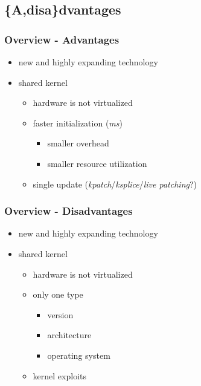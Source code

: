 \documentclass{beamer}
\begin{document}
\subsection{\{A,disa\}dvantages}

\begin{frame}
    \frametitle{Overview - Advantages}
    \begin{itemize}
        \item new and highly expanding technology
        \item shared kernel
            \begin{itemize}
                \item hardware is not virtualized
                \item faster initialization (\textit{ms})
                \begin{itemize}
                    \item smaller overhead
                    \item smaller resource utilization
                \end{itemize}
                \item single update
                    (\textit{kpatch}/\textit{ksplice}/\textit{live patching}?)
            \end{itemize}
    \end{itemize}
\end{frame}

\begin{frame}
    \frametitle{Overview - Disadvantages}
    \begin{itemize}
        \item new and highly expanding technology
        \item shared kernel
        \begin{itemize}
            \item hardware is not virtualized
            \item only one type
            \begin{itemize}
                \item version
                \item architecture
                \item operating system
            \end{itemize}
            \item kernel exploits
        \end{itemize}
    \end{itemize}
\end{frame}
\end{document}
